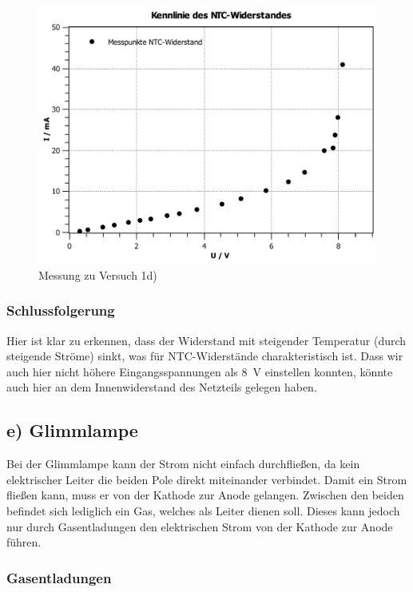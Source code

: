 \documentclass[11pt,a4paper,titlepage, ngerman]{article}
\begin{document}
				\begin{figure}
					\centering
					\includegraphics[width=\textwidth]{KennlinieNTCsubgitter.pdf}
					\caption{Messung zu Versuch 1d)}
					\label{KL d}
				\end{figure}
			
			\subsubsection*{Schlussfolgerung}
			
				Hier ist klar zu erkennen, dass der Widerstand mit steigender Temperatur (durch steigende Ströme) sinkt, was für NTC-Widerstände charakteristisch ist. 
				Dass wir auch hier nicht höhere Eingangsspannungen als \SI{8}{\V} einstellen konnten, könnte auch hier an dem Innenwiderstand des Netzteils gelegen haben.
			
		\subsection{e) Glimmlampe} 
			
			Bei der Glimmlampe kann der Strom nicht einfach durchfließen, da kein elektrischer Leiter die beiden Pole direkt miteinander verbindet.
			Damit ein Strom fließen kann, muss er von der Kathode zur Anode gelangen.
			Zwischen den beiden befindet sich lediglich ein Gas, welches als Leiter dienen soll.
			Dieses kann jedoch nur durch Gasentladungen den elektrischen Strom von der Kathode zur Anode führen.
			
			\subsubsection*{Gasentladungen}
			
\end{document}
